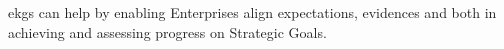 %
%
\Glspl{ekg} can help by enabling Enterprises align expectations, evidences and
 both in achieving and assessing progress on Strategic Goals.

